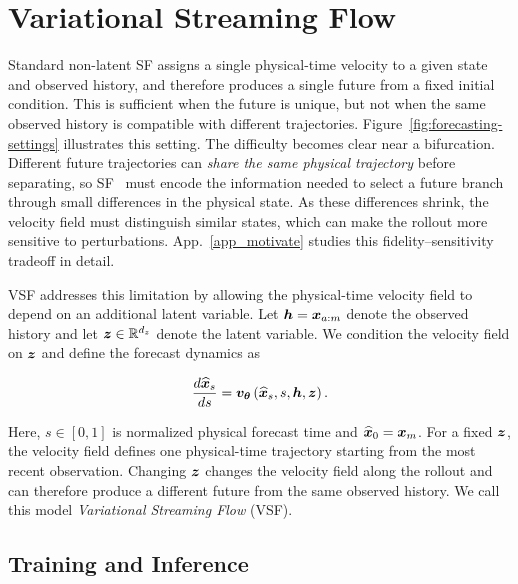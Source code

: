 \section{Variational Streaming Flow}
\label{sec:method}

Standard non-latent SF assigns a single physical-time velocity to a given
state and observed history, and therefore produces a single future from a fixed initial condition. This is sufficient when the future is unique, but not when the same observed history is compatible with different trajectories.
Figure~\ref{fig:forecasting-settings} illustrates this setting.
%
The difficulty becomes clear near a bifurcation. Different future
trajectories can  \emph{share the same physical trajectory} before separating, so SF~\citep{jiang2025streaming} must encode the information needed to select a future branch through small
differences in the physical state. As these differences shrink, the velocity
field must distinguish similar states, which can make the rollout more
sensitive to perturbations. App.~\ref{app_motivate} studies this
fidelity--sensitivity tradeoff in detail.

VSF addresses this limitation by allowing the physical-time velocity field to
depend on an additional latent variable. Let ${\bm{h}}={\bm{x}}_{a:m}$ denote the
observed history and let ${\bm{z}}\in\mathbb R^{d_z}$ denote the latent variable.
We condition the velocity field on ${\bm{z}}$ and define the forecast dynamics as
%
\begin{tcolorbox}[
colback=parchment,
colframe=sandborder,
boxrule=0.3pt,
left=8pt,
right=8pt,
top=3pt,
bottom=3pt
]
\begin{equation}
\frac{d\widehat{{\bm{x}}}_s}{ds}
=
{\bm{v}}_{{\bm{\theta}}}
\left(
\widehat{{\bm{x}}}_s,s,{\bm{h}},{\bm{z}}
\right).
\label{eq:vsf_dynamics}
\end{equation}
\end{tcolorbox}
%
Here, $s\in[0,1]$ is normalized physical forecast time and $\widehat{{\bm{x}}}_0={\bm{x}}_m$. For a fixed ${\bm{z}}$, the velocity field defines one physical-time trajectory starting from the most recent observation. Changing ${\bm{z}}$ changes the velocity field along the rollout and can therefore produce a different future from the same observed history. We call this model \emph{Variational Streaming Flow} (VSF). 

\subsection{Training and Inference}
\label{sec:vsf-training-inference}

